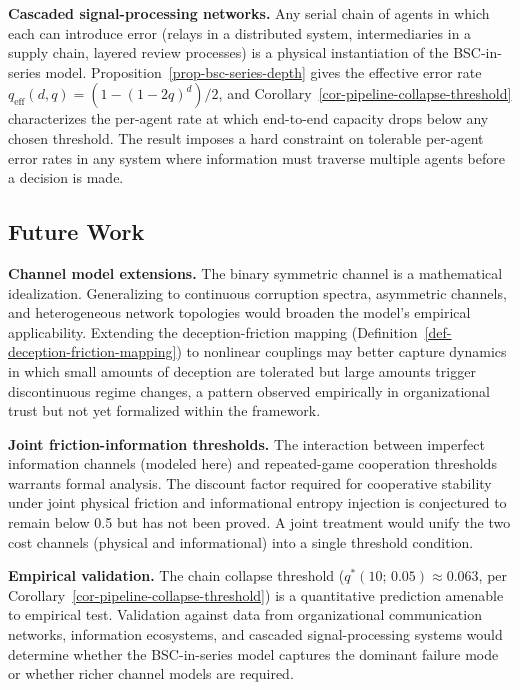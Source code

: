 \documentclass[11pt]{article}
\theoremstyle{plain}
\theoremstyle{definition}
\theoremstyle{remark}
\let\origsubsection\subsection
\renewcommand{\subsection}{\needspace{7\baselineskip}\origsubsection}
\begin{document}
\textbf{Cascaded signal-processing networks.} Any serial chain of agents
in which each can introduce error (relays in a distributed system,
intermediaries in a supply chain, layered review processes) is a
physical instantiation of the BSC-in-series model.
Proposition~\ref{prop-bsc-series-depth} gives the effective error rate
\(q_{\text{eff}}(d, q) = (1 - (1 - 2q)^d)/2\), and
Corollary~\ref{cor-pipeline-collapse-threshold} characterizes the
per-agent rate at which end-to-end capacity drops below any chosen
threshold. The result imposes a hard constraint on tolerable per-agent
error rates in any system where information must traverse multiple
agents before a decision is made.

\subsection{Future Work}\label{future-work}

\textbf{Channel model extensions.} The binary symmetric channel is a
mathematical idealization. Generalizing to continuous corruption
spectra, asymmetric channels, and heterogeneous network topologies would
broaden the model's empirical applicability. Extending the
deception-friction mapping
(Definition~\ref{def-deception-friction-mapping}) to nonlinear couplings
may better capture dynamics in which small amounts of deception are
tolerated but large amounts trigger discontinuous regime changes, a
pattern observed empirically in organizational trust but not yet
formalized within the framework.

\textbf{Joint friction-information thresholds.} The interaction between
imperfect information channels (modeled here) and repeated-game
cooperation thresholds \citep{TC-V} warrants formal analysis. The
discount factor required for cooperative stability under joint physical
friction and informational entropy injection is conjectured to remain
below 0.5 but has not been proved. A joint treatment would unify the two
cost channels (physical and informational) into a single threshold
condition.

\textbf{Empirical validation.} The chain collapse threshold
(\(q^*(10;\,0.05) \approx 0.063\), per
Corollary~\ref{cor-pipeline-collapse-threshold}) is a quantitative
prediction amenable to empirical test. Validation against data from
organizational communication networks, information ecosystems, and
cascaded signal-processing systems would determine whether the
BSC-in-series model captures the dominant failure mode or whether richer
channel models are required.
\end{document}
